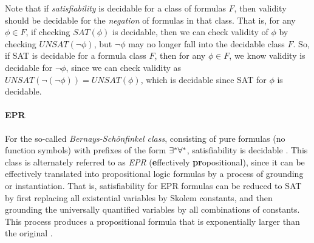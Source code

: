 \documentclass[10pt]{article}
\begin{document}
Note that if \textit{satisfiability} is decidable for a class of formulas $F$, then validity should be decidable for the \textit{negation} of formulas in that class. That is, for any $\phi \in F$, if  checking $SAT(\phi)$ is decidable, then we can check validity of $\phi$ by checking $UNSAT(\neg \phi)$, but $\neg \phi$ may no longer fall into the decidable class $F$. So, if SAT is decidable for a formula class $F$, then for any $\phi \in F$, we know validity is decidable for $\neg \phi$, since we can check validity as $UNSAT(\neg (\neg \phi))=UNSAT(\phi)$, which is decidable since SAT for $\phi$ is decidable.




\paragraph{EPR}

For the so-called \textit{Bernays-Sch\"{o}nfinkel class}, consisting of pure formulas (no function symbols) with prefixes of the form $\exists^*\forall^*$, satisfiability is decidable \cite{lewis1980complexity}. This class is alternately referred to as \textit{EPR} (\textbf{e}ffectively \textbf{pr}opositional), since it can be effectively translated into propositional logic formulas by a process of grounding or instantiation. That is, satisfiability for EPR formulas can be reduced to SAT by first replacing all existential variables by Skolem constants, and then grounding the universally quantified variables by all combinations of constants. This process produces a propositional formula that is exponentially larger than the original \cite{demoura2008deciding}.

\end{document}
